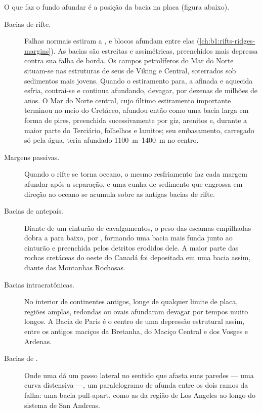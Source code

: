 O que faz o fundo afundar é a posição da bacia na placa (figura abaixo).

\begin{description}
  \item[Bacias de rifte.] Falhas normais estiram a , e blocos afundam entre elas
        (\cref{ch:b1:rifts-ridges-margins}). As bacias são estreitas e assimétricas, 
        preenchidos mais depressa contra sua falha de borda. Os campos petrolíferos do Mar do
        Norte situam-se nas estruturas de seus  de Viking e Central, soterrados sob
        sedimentos mais jovens. Quando o estiramento para, a  afinada e aquecida
        esfria, contrai-se e continua afundando, devagar, por dezenas de milhões de anos. O
        Mar do Norte central, cujo último estiramento importante terminou no meio do Cretáceo,
        afundou então como uma bacia larga em forma de pires, preenchida sucessivamente por giz,
        arenitos e, durante a maior parte do Terciário, folhelhos e lamitos; seu embasamento,
        carregado só pela água, teria afundado \qtyrange{1100}{1400}{m} no centro.
  \item[Margens passivas.] Quando o rifte se torna oceano, o mesmo resfriamento faz cada
        margem afundar após a separação, e uma cunha de sedimento que engrossa em direção ao
        oceano se acumula sobre as antigas bacias de rifte.
  \item[Bacias de antepaís.] Diante de um cinturão de cavalgamentos, o peso das escamas
        empilhadas dobra a  para baixo, por , formando uma bacia mais funda
        junto ao cinturão e preenchida pelos detritos erodidos dele. A maior parte das rochas
        cretáceas do oeste do Canadá foi depositada em uma bacia assim, diante das Montanhas
        Rochosas.
  \item[Bacias intracratônicas.] No interior de continentes antigos, longe de qualquer limite
        de placa, regiões amplas, redondas ou ovais afundaram devagar por tempos muito longos.
        A Bacia de Paris é o centro de uma depressão estrutural assim, entre os antigos maciços
        da Bretanha, do Maciço Central e dos Vosges e Ardenas.
  \item[Bacias de .] Onde uma  dá um passo lateral no
        sentido que afasta suas paredes --- uma curva distensiva ---, um paralelogramo de
         afunda entre os dois ramos da falha: uma bacia pull-apart, como as da região de
        Los Angeles ao longo do sistema de San Andreas.
\end{description}


